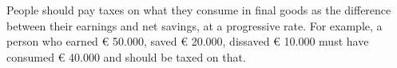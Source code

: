 People should pay taxes on what they consume in final goods as the difference between their earnings and net savings, at a progressive rate.
For example, a person who earned € 50.000, saved € 20.000, dissaved € 10.000 must have consumed € 40.000 and should be taxed on that.